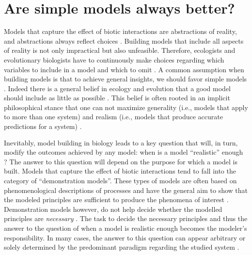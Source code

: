 \documentclass[12pt]{article}
\begin{document}
\section*{Are simple models always better?}
Models that capture the effect of biotic interactions are abstractions of reality, and abstractions always reflect choices \citep{levins2006strategies}. Building models that include all aspects of reality is not only impractical but also unfeasible.  Therefore, ecologists and evolutionary biologists have to continuously make choices regarding which variables to include in a model and which to omit \citep{evans2012predictive, rossberg2019let}. A common assumption when building models is that to achieve general insights, we should favor simple models \citep{evans2013simple}. Indeed there is a general belief in ecology and evolution that a good model should include as little as possible \citep{evans2013simple,orzack2012philosophy}. This belief is often rooted in an implicit philosophical stance that one can not maximize generality (i.e., models that apply to more than one system) and realism (i.e., models that produce accurate predictions for a system) \citep{levins2006strategies,evans2012predictive}.


Inevitably, model building in biology leads to a key question that will, in turn, modify the outcomes achieved by any model: when is a model ``realistic'' enough \citep{stouffer2019all}? The answer to this question will depend on the purpose for which a model is built. Models that capture the effect of biotic interactions tend to fall into the category of ``demonstration models''. These types of models are often based on phenomenological descriptions of processes and have the general aim to show that the modeled principles are sufficient to produce the phenomena of interest \citep{evans2013simple}.  Demonstration models however, do not help decide whether the modelled principles are \textit{necessary} \citep{evans2013simple}. The task to decide the necessary principles and thus the answer to the question of when a model is realistic enough becomes the modeler's responsibility. In many cases, the answer to this question can appear arbitrary or solely determined by the predominant paradigm regarding the studied system \citep{holland2006comment,bascompte2006response,kokko2007ecogenetic,aladwani2019addition,mayfield2017higher,martyn2021identifying}.
\end{document}
